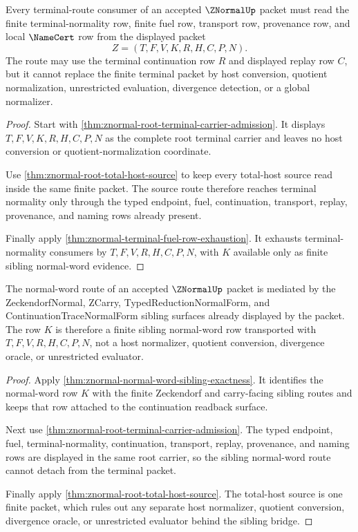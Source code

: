 \begin{theorem}
\label{thm:znormal-terminal-route-field-exhaustion}
Every terminal-route consumer of an accepted $\ZNormalUp$ packet must read the
finite terminal-normality row, finite fuel row, transport row, provenance row,
and local $\NameCert$ row from the displayed packet
$$
Z=(T,F,V,K,R,H,C,P,N).
$$
The route may use the terminal continuation row $R$ and displayed replay row
$C$, but it cannot replace the finite terminal packet by host conversion,
quotient normalization, unrestricted evaluation, divergence detection, or a
global normalizer.
\end{theorem}
\begin{proof}
Start with \autoref{thm:znormal-root-terminal-carrier-admission}. It displays
$T,F,V,K,R,H,C,P,N$ as the complete root terminal carrier and leaves no host
conversion or quotient-normalization coordinate.

Use \autoref{thm:znormal-root-total-host-source} to keep every total-host
source read inside the same finite packet. The source route therefore reaches
terminal normality only through the typed endpoint, fuel, continuation,
transport, replay, provenance, and naming rows already present.

Finally apply \autoref{thm:znormal-terminal-fuel-row-exhaustion}. It exhausts
terminal-normality consumers by $T,F,V,R,H,C,P,N$, with $K$ available only as
finite sibling normal-word evidence.
\end{proof}

\begin{theorem}
\label{thm:znormal-normal-word-sibling-bridge}
The normal-word route of an accepted $\ZNormalUp$ packet is mediated by the
ZeckendorfNormal, ZCarry, TypedReductionNormalForm, and
ContinuationTraceNormalForm sibling surfaces already displayed by the packet.
The row $K$ is therefore a finite sibling normal-word row transported with
$T,F,V,R,H,C,P,N$, not a host normalizer, quotient conversion, divergence
oracle, or unrestricted evaluator.
\end{theorem}
\begin{proof}
Apply \autoref{thm:znormal-normal-word-sibling-exactness}. It identifies the
normal-word row $K$ with the finite Zeckendorf and carry-facing sibling routes
and keeps that row attached to the continuation readback surface.

Next use \autoref{thm:znormal-root-terminal-carrier-admission}. The typed
endpoint, fuel, terminal-normality, continuation, transport, replay,
provenance, and naming rows are displayed in the same root carrier, so the
sibling normal-word route cannot detach from the terminal packet.

Finally apply \autoref{thm:znormal-root-total-host-source}. The total-host
source is one finite packet, which rules out any separate host normalizer,
quotient conversion, divergence oracle, or unrestricted evaluator behind the
sibling bridge.
\end{proof}

